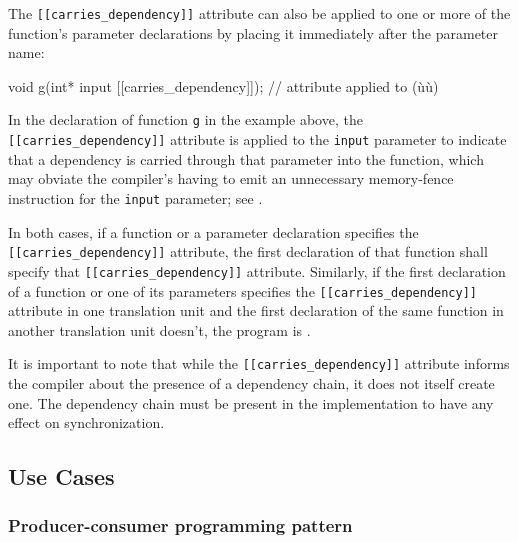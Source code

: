 The \lstinline![[carries_dependency]]! attribute can also be applied
to one or more of the function's parameter declarations by placing it
immediately after the parameter name:

\begin{emcppslisting}
void g(int* input [[carries_dependency]]); // attribute applied to (ù{}ù)
\end{emcppslisting}
    
\noindent In the declaration of function \lstinline!g! in the example above, the
\lstinline![[carries_dependency]]! attribute is applied to the
\lstinline!input! parameter to indicate that a dependency is carried
through that parameter into the function, which may obviate the
compiler's having to emit an unnecessary memory-fence instruction for
the \lstinline!input! parameter; see .

In both cases, if a function or a parameter declaration specifies the
\lstinline![[carries_dependency]]! attribute, the first declaration of
that function shall specify that \lstinline![[carries_dependency]]!
attribute. Similarly, if the first declaration of a function or one of
its parameters specifies the \lstinline![[carries_dependency]]! attribute
in one translation unit and the first declaration of the same function
in another translation unit doesn't, the program is .


It is important to note that while the \lstinline![[carries_dependency]]! attribute informs the compiler about the presence of a dependency chain, it does not itself create one.  The dependency chain must be present in the implementation to have any effect on synchronization.

\subsection[Use Cases]{Use Cases}\label{use-cases-carriesdependency}

\subsubsection[Producer-consumer programming pattern]{Producer-consumer programming pattern}\label{producer-consumer-programming-pattern}

